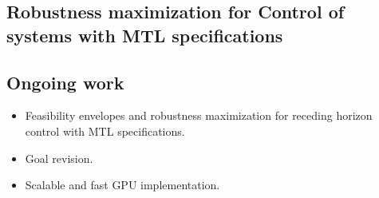 \subsection{Robustness maximization for Control of systems with MTL specifications}


\subsection{Ongoing work}
\begin{itemize}
\item Feasibility envelopes and robustness maximization for receding horizon control with MTL specifications.
\item Goal revision.
\item Scalable and fast GPU implementation.
\end{itemize}